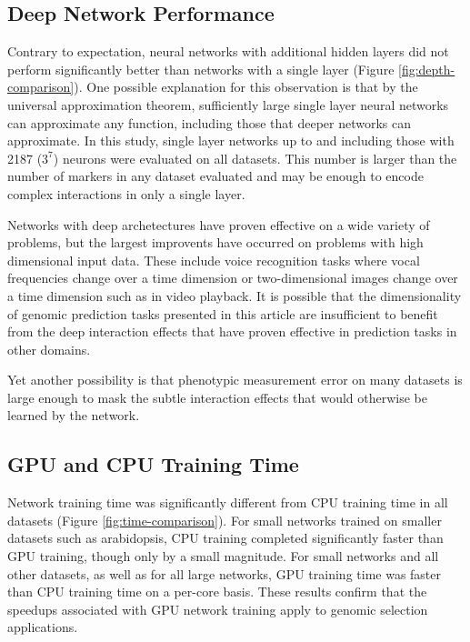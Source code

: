 \subsection*{Deep Network Performance}

Contrary to expectation, neural networks with additional hidden layers did not perform
significantly better than networks with a single layer (Figure \ref{fig:depth-comparison}). 
One possible explanation for this observation is that by the universal approximation theorem,
sufficiently large single layer neural networks can approximate any function, including those
that deeper networks can approximate. In this study, single layer networks up to and including
those with 2187 ($3^7$) neurons were evaluated on all datasets. This number is larger than the number
of markers in any dataset evaluated and may be enough to encode complex interactions in only a single
layer.

Networks with deep archetectures have proven effective on a wide variety of problems, but the largest
improvents have occurred on problems with high dimensional input data. These include voice recognition 
tasks where vocal frequencies change over a time dimension or two-dimensional images change over 
a time dimension such as in video playback. It is possible that the dimensionality of genomic 
prediction tasks presented in this article are insufficient to benefit from the deep interaction 
effects that have proven effective in prediction tasks in other domains. 

Yet another possibility is that phenotypic measurement error on many datasets is large enough 
to mask the subtle interaction effects that would otherwise be learned by the network.

\ifdefined\showtablesandfigures
\fi

\subsection*{GPU and CPU Training Time}

Network training time was significantly different from CPU training time in all datasets 
(Figure \ref{fig:time-comparison}).  For small networks trained on smaller datasets 
such as arabidopsis, CPU training completed significantly faster than GPU training, 
though only by a small magnitude. For small networks and all other datasets, as well 
as for all large networks, GPU training time was faster than CPU training time on a 
per-core basis. These results confirm that the speedups associated 
with GPU network training apply to genomic selection applications.  


